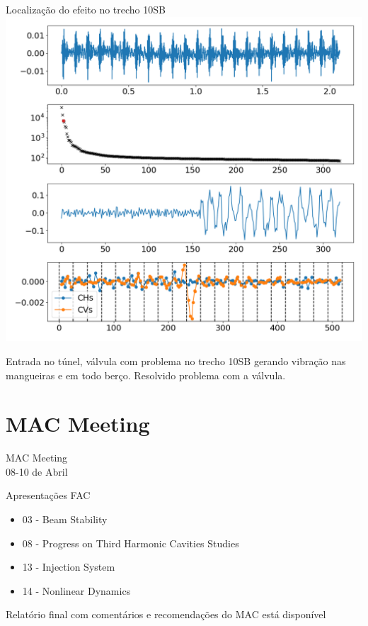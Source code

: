 \documentclass[1610]{beamer}					  %
\begin{document}
\begin{frame}{Localização do efeito no trecho 10SB}
\centering
    \includegraphics[scale=0.25]{2024-04-19/figures/bpm_data_rate_fofb_sofbstate_off_fofbstate_off_gain_0p052_rfline_off_llrf_ki_8000_kp_155.png}

Entrada no túnel, válvula com problema no trecho 10SB gerando vibração nas mangueiras e em todo berço. Resolvido problema com a válvula.
\end{frame}

\section{MAC Meeting}

\begin{frame}
    \Huge{MAC Meeting}\\
    \normalsize{08-10 de Abril}
\end{frame}

\begin{frame}{Apresentações FAC}
    \begin{itemize}
        \item 03 - Beam Stability
        \item 08 - Progress on Third Harmonic Cavities Studies
        \item 13 - Injection System
        \item 14 - Nonlinear Dynamics
    \end{itemize}

    Relatório final com comentários e recomendações do MAC está disponível
\end{frame}
\end{document}
